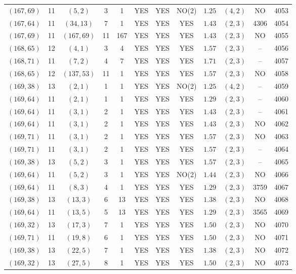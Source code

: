 \begin{longtable}{|c|c|c|c|c|c|c|c|c|c|c|c|}
$(167,69)$ & 11 & $(5,2)$ & 3 & 1 & YES & YES & NO(2) & $1.25$ & $(4,2)$ & NO & 4053\\
$(167,64)$ & 11 & $(34,13)$ & 7 & 1 & YES & YES & YES & $1.43$ & $(2,3)$ & 4306 & 4054\\
$(167,69)$ & 11 & $(167,69)$ & 11 & 167 & YES & YES & YES & $1.43$ & $(2,3)$ & NO & 4055\\
$(168,65)$ & 12 & $(4,1)$ & 3 & 4 & YES & YES & YES & $1.57$ & $(2,3)$ & -- & 4056\\
$(168,71)$ & 11 & $(7,2)$ & 4 & 7 & YES & YES & YES & $1.71$ & $(2,3)$ & -- & 4057\\
$(168,65)$ & 12 & $(137,53)$ & 11 & 1 & YES & YES & YES & $1.57$ & $(2,3)$ & NO & 4058\\
$(169,38)$ & 13 & $(2,1)$ & 1 & 1 & YES & YES & NO(2) & $1.25$ & $(4,2)$ & -- & 4059\\
$(169,64)$ & 11 & $(2,1)$ & 1 & 1 & YES & YES & YES & $1.29$ & $(2,3)$ & -- & 4060\\
$(169,64)$ & 11 & $(3,1)$ & 2 & 1 & YES & YES & YES & $1.43$ & $(2,3)$ & -- & 4061\\
$(169,64)$ & 11 & $(3,1)$ & 2 & 1 & YES & YES & YES & $1.43$ & $(2,3)$ & NO & 4062\\
$(169,71)$ & 11 & $(3,1)$ & 2 & 1 & YES & YES & YES & $1.57$ & $(2,3)$ & NO & 4063\\
$(169,71)$ & 11 & $(3,1)$ & 2 & 1 & YES & YES & YES & $1.57$ & $(2,3)$ & -- & 4064\\
$(169,38)$ & 13 & $(5,2)$ & 3 & 1 & YES & YES & YES & $1.57$ & $(2,3)$ & -- & 4065\\
$(169,64)$ & 11 & $(5,2)$ & 3 & 1 & YES & YES & NO(2) & $1.44$ & $(2,3)$ & NO & 4066\\
$(169,64)$ & 11 & $(8,3)$ & 4 & 1 & YES & YES & YES & $1.29$ & $(2,3)$ & 3759 & 4067\\
$(169,38)$ & 13 & $(13,3)$ & 6 & 13 & YES & YES & YES & $1.38$ & $(2,3)$ & NO & 4068\\
$(169,64)$ & 11 & $(13,5)$ & 5 & 13 & YES & YES & YES & $1.29$ & $(2,3)$ & 3565 & 4069\\
$(169,32)$ & 13 & $(17,3)$ & 7 & 1 & YES & YES & YES & $1.50$ & $(2,3)$ & NO & 4070\\
$(169,71)$ & 11 & $(19,8)$ & 6 & 1 & YES & YES & YES & $1.50$ & $(2,3)$ & NO & 4071\\
$(169,38)$ & 13 & $(22,5)$ & 7 & 1 & YES & YES & YES & $1.38$ & $(2,3)$ & NO & 4072\\
$(169,32)$ & 13 & $(27,5)$ & 8 & 1 & YES & YES & YES & $1.50$ & $(2,3)$ & NO & 4073\\

\end{longtable}
